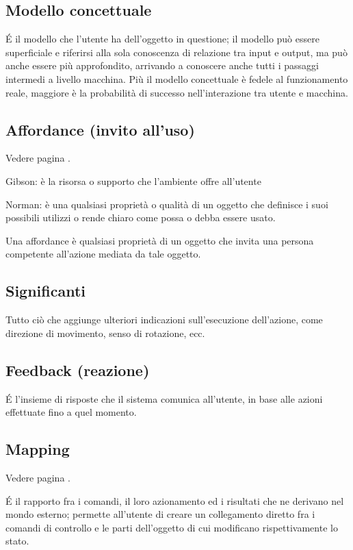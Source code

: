 \documentclass[11pt,a4paper]{book}
\begin{document}
\subsection{Modello concettuale}
É il modello che l’utente ha dell’oggetto in questione; il modello può essere superficiale e riferirsi alla sola conoscenza di relazione tra input e output, ma può anche essere più approfondito, arrivando a conoscere anche tutti i passaggi intermedi a livello macchina. Più il modello concettuale è fedele al funzionamento reale, maggiore è la probabilità di successo nell’interazione tra utente e macchina.

\subsection{Affordance (invito all’uso)} 
Vedere pagina \pageref{par: affordance}.

Gibson: è la risorsa o supporto che l'ambiente offre all'utente

Norman: è una qualsiasi proprietà o qualità di un oggetto che definisce i suoi possibili utilizzi o rende chiaro come possa o debba essere usato.

Una affordance è qualsiasi proprietà di un oggetto che invita una persona competente all'azione mediata da tale oggetto.

\subsection{Significanti}
Tutto ciò che aggiunge ulteriori indicazioni sull’esecuzione dell’azione, come direzione di movimento, senso di rotazione, ecc.

\subsection{Feedback (reazione)}
É l’insieme di risposte che il sistema comunica all’utente, in base alle azioni effettuate fino a quel momento.

\subsection{Mapping} 
Vedere pagina \pageref{par: mapping}.
	
É il rapporto fra i comandi, il loro azionamento ed i risultati che ne derivano nel mondo esterno; permette all’utente di creare un collegamento diretto fra i comandi di controllo e le parti dell’oggetto di cui modificano rispettivamente lo stato.
\end{document}
